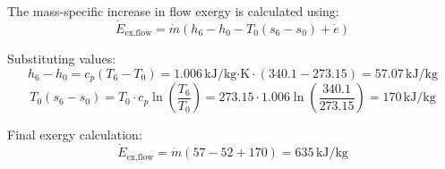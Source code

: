 The mass-specific increase in flow exergy is calculated using:  
\[
\dot{E}_{\text{ex,flow}} = \dot{m} \left( h_6 - h_0 - T_0 \left( s_6 - s_0 \right) + \dot{e} \right)
\]  

Substituting values:  
\[
h_6 - h_0 = c_p \left( T_6 - T_0 \right) = 1.006 \, \text{kJ/kg·K} \cdot \left( 340.1 - 273.15 \right) = 57.07 \, \text{kJ/kg}
\]  
\[
T_0 \left( s_6 - s_0 \right) = T_0 \cdot c_p \ln \left( \frac{T_6}{T_0} \right) = 273.15 \cdot 1.006 \ln \left( \frac{340.1}{273.15} \right) = 170 \, \text{kJ/kg}
\]  

Final exergy calculation:  
\[
\dot{E}_{\text{ex,flow}} = \dot{m} \left( 57 - 52 + 170 \right) = 635 \, \text{kJ/kg}
\]